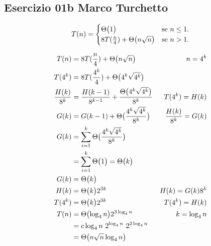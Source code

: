 
\subsection[01b MT]{Esercizio 01b Marco Turchetto}

\begin{equation}
	T(n)=\begin{cases}
		\Theta\bigl(1\bigr)							            & \text{se $n \leq 1$}.\\
		\text{$8T( \frac{n}{4} ) + \Theta\bigl(n \sqrt{n}\bigr) $} & \text{se $n > 1$}.
 	\end{cases}
\end{equation}

\begin{align*}
	T(n) &= 8T(\frac{n}{4}) + \Theta\bigl( n \sqrt{n}\bigr)  & n = 4^k \\
	T(4^k) &= 8T(\frac{4^k}{4}) + \Theta\bigl(4^k \sqrt{4^k}\bigr) \\
	\frac{H(k)}{8^k} &= \frac{H(k-1)}{8^{k-1}} + \frac{\Theta\bigl(4^k \sqrt{4^k}\bigr)}{8^k} & T(4^k) = H(k) \\
	G(k) &= G(k-1) + \Theta\bigl(\frac{4^k \sqrt{4^k}}{8^k}\bigr) & \frac{H(k)}{8^k} = G(k)\\
	G(k) &= \sum _{i=1} ^{k} \Theta\bigl(\frac{4^k \sqrt{4^k}}{8^k}\bigr) \\
	     &= \sum _{i=1} ^{k} \Theta\bigl(1\bigr) = \Theta\bigl(k\bigr) \\
	G(k) &= \Theta\bigl(k\bigr) \\
	H(k) &= \Theta\bigl(k\bigr) 2^{3k} & H(k) = G(k) 8^k\\
	T(4^k) &= \Theta\bigl(k\bigr) 2^{3k} & T(4^k) = H(k) \\
	T(n) &= \Theta\bigl(\log _4 n\bigr) 2^{3 \log_4 n} & k= \log_4 n \\ 
	     &= c \log _4 n \ 2^{\log_4 n} \ 2 ^ {2 \log _ 4 n} \\
	     &= \Theta\bigl(n \sqrt{n} \log_4 n\bigr)
\end{align*}

